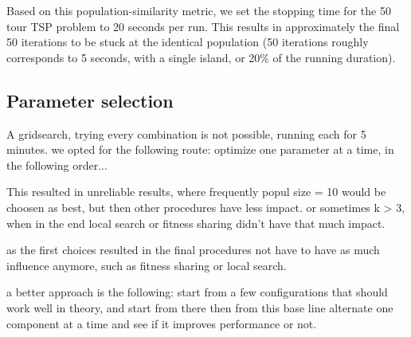 \documentclass[a4paper,10pt]{article}
\newcommand{\ReplaceMe}[1]{{\color{blue}#1}}
\begin{document}
Based on this population-similarity metric, we set the stopping time for the 50 tour TSP problem to 20 seconds per run. This results in approximately the final 50 iterations to be stuck at the identical population (50 iterations roughly corresponds to 5 seconds, with a single island, or 20\% of the running duration).



\subsection{Parameter selection}
	A gridsearch, trying every combination is not possible, running each for 5 minutes.
	we opted for the following route:
	optimize one parameter at a time, in the following order...
	
	This resulted in unreliable results, where frequently popul size = 10 would be choosen as best, but then other procedures have less impact. or sometimes k > 3, 
	when in the end local search or fitness sharing didn't have that much impact.
	
	as the first choices resulted in the final procedures not have to have as much influence anymore, such as fitness sharing or local search.
	
	a better approach is the following:
	start from a few configurations that should work well in theory, and start from there
	then from this base line alternate one component at a time and see if it improves performance or not.


	
\end{document}

